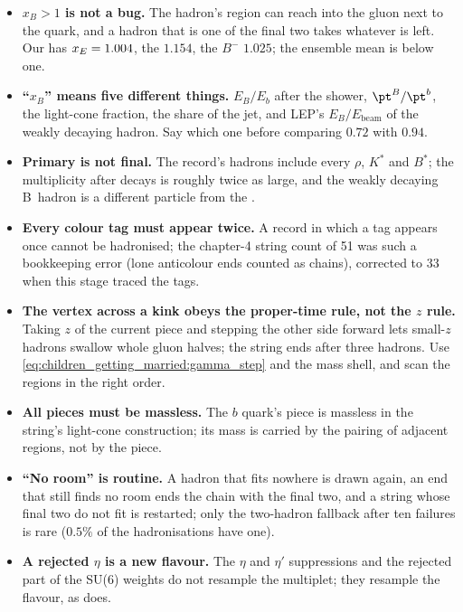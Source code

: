 \begin{pitfalls}
\begin{itemize}[nosep]
  \item \textbf{$x_B>1$ is not a bug.} The hadron's region can reach into
    the gluon next to the quark, and a hadron that is one of the final two
    takes whatever is left. Our \Bstarbar has $x_E=1.004$, the \Bstar
    $1.154$, the \CMSSW $B^-$ $1.025$; the ensemble mean is below one.
  \item \textbf{``$x_B$'' means five different things.} $E_B/E_b$ after
    the shower, $\pt^B/\pt^b$, the light-cone fraction, the share of the
    jet, and LEP's $E_B/E_{\mathrm{beam}}$ of the weakly decaying hadron.
    Say which one before comparing $0.72$ with $0.94$.
  \item \textbf{Primary is not final.} The record's hadrons include
    every $\rho$, $K^*$ and $B^*$; the multiplicity after decays is roughly
    twice as large, and the weakly decaying B~hadron is a different
    particle from the \Bstarbar.
  \item \textbf{Every colour tag must appear twice.} A record in which a
    tag appears once cannot be hadronised; the chapter-4 string count of
    51 was such a bookkeeping error (lone anticolour ends counted as
    chains), corrected to 33 when this stage traced the tags.
  \item \textbf{The vertex across a kink obeys the proper-time rule, not the
    $z$ rule.} Taking $z$ of the current piece and stepping the other side
    forward lets small-$z$ hadrons swallow whole gluon halves; the string
    ends after three hadrons. Use \cref{eq:children_getting_married:gamma_step}
    and the mass shell, and scan the regions in the right order.
  \item \textbf{All pieces must be massless.} The $b$ quark's piece is
    massless in the string's light-cone construction; its mass is carried
    by the pairing of adjacent regions, not by the piece.
  \item \textbf{``No room'' is routine.} A hadron that fits nowhere is
    drawn again, an end that still finds no room ends the chain with the
    final two, and a string whose final two do not fit is restarted; only
    the two-hadron fallback after ten failures is rare ($0.5\%$ of the
    hadronisations have one).
  \item \textbf{A rejected $\eta$ is a new flavour.} The $\eta$ and
    $\eta'$ suppressions and the rejected part of the SU(6) weights do
    not resample the multiplet; they resample the flavour, as \PYTHIA does.

\end{itemize}
\end{pitfalls}
